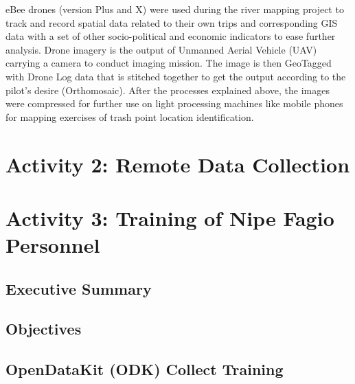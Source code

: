 \documentclass[a4paper,12pt,twoside]{article}
\begin{document}
    \begin{multicols}{2}
    eBee drones (version Plus and X) were used during the river mapping project to track and record spatial data related to their own trips and corresponding GIS data with a set of other socio-political and economic indicators to ease further analysis. Drone imagery is the output of Unmanned Aerial Vehicle (UAV) carrying a camera to conduct imaging mission. The image is then GeoTagged with Drone Log data that is stitched together to get the output according to the pilot’s desire (Orthomosaic). After the processes explained above, the images were compressed for further use on light processing machines like mobile phones for mapping exercises of trash point location identification.
    \end{multicols}
    
\section{Activity 2: Remote Data Collection}

\section{Activity 3: Training of Nipe Fagio Personnel}

\subsection{Executive Summary}

    \begin{multicols}{2}
    \lipsum[0-5]
    \end{multicols}

\subsection{Objectives}

    \begin{multicols}{2}
    \lipsum[0-5]
    \end{multicols}

\subsection{OpenDataKit (ODK) Collect Training}

    \begin{multicols}{2}
    \lipsum[0-5]
    \end{multicols}
\end{document}
